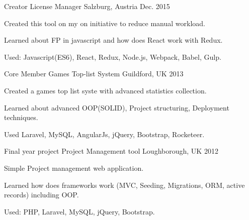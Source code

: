 

\begin{cventries}

  \cventry
    {Creator} %
    {License Manager} %
    {Salzburg, Austria} %
    {Dec. 2015} %
    {
      \begin{cvitems} %
        \item {Created this tool on my on initiative to reduce manual workload.}
        \item {Learned about FP in javascript and how does React work with Redux.}
        \item {Used: Javascript(ES6), React, Redux, Node.js, Webpack, Babel, Gulp.}
      \end{cvitems}
    }

  \cventry
    {Core Member} %
    {Games Top-list System} %
    {Guildford, UK} %
    {2013} %
    {
      \begin{cvitems} %
        \item {Created a games top list syste with advanced statistics collection.}
        \item {Learned about advanced OOP(SOLID), Project structuring, Deployment techniques.}
        \item {Used Laravel, MySQL, AngularJs, jQuery, Bootstrap, Rocketeer.}
      \end{cvitems}
    }

  \cventry
    {Final year project} %
    {Project Management tool} %
    {Loughborough, UK} %
    {2012} %
    {
      \begin{cvitems} %
        \item {Simple Project management web application.}
        \item {Learned how does frameworks work (MVC, Seeding, Migrations, ORM, active records) including OOP.}
        \item {Used: PHP, Laravel, MySQL, jQuery, Bootstrap.}
      \end{cvitems}
    }
\end{cventries}
